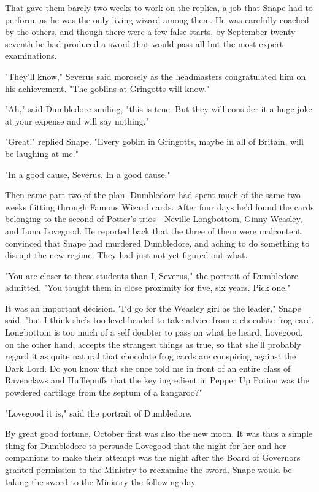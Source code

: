 That gave them barely two weeks to work on the replica, a job that Snape had to perform, as he was the only living wizard among them. He was carefully coached by the others, and though there were a few false starts, by September twenty-seventh he had produced a sword that would pass all but the most expert examinations.

"They'll know," Severus said morosely as the headmasters congratulated him on his achievement. "The goblins at Gringotts will know."

"Ah," said Dumbledore smiling, "this is true. But they will consider it a huge joke at your expense and will say nothing."

"Great!" replied Snape. "Every goblin in Gringotts, maybe in all of Britain, will be laughing at me."

"In a good cause, Severus. In a good cause."

Then came part two of the plan. Dumbledore had spent much of the same two weeks flitting through Famous Wizard cards. After four days he'd found the cards belonging to the second of Potter's trios - Neville Longbottom, Ginny Weasley, and Luna Lovegood. He reported back that the three of them were malcontent, convinced that Snape had murdered Dumbledore, and aching to do something to disrupt the new regime. They had just not yet figured out what.

"You are closer to these students than I, Severus," the portrait of Dumbledore admitted. "You taught them in close proximity for five, six years. Pick one."

It was an important decision. "I'd go for the Weasley girl as the leader," Snape said, "but I think she's too level headed to take advice from a chocolate frog card. Longbottom is too much of a self doubter to pass on what he heard. Lovegood, on the other hand, accepts the strangest things as true, so that she'll probably regard it as quite natural that chocolate frog cards are conspiring against the Dark Lord. Do you know that she once told me in front of an entire class of Ravenclaws and Hufflepuffs that the key ingredient in Pepper Up Potion was the powdered cartilage from the septum of a kangaroo?"

"Lovegood it is," said the portrait of Dumbledore.

By great good fortune, October first was also the new moon. It was thus a simple thing for Dumbledore to persuade Lovegood that the night for her and her companions to make their attempt was the night after the Board of Governors granted permission to the Ministry to reexamine the sword. Snape would be taking the sword to the Ministry the following day.

